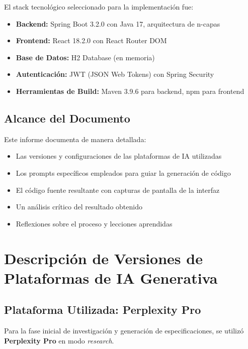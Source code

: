 \documentclass[11pt,a4paper]{article}
\begin{document}
El stack tecnológico seleccionado para la implementación fue:

\begin{itemize}
    \item \textbf{Backend:} Spring Boot 3.2.0 con Java 17, arquitectura de n-capas
    \item \textbf{Frontend:} React 18.2.0 con React Router DOM
    \item \textbf{Base de Datos:} H2 Database (en memoria)
    \item \textbf{Autenticación:} JWT (JSON Web Tokens) con Spring Security
    \item \textbf{Herramientas de Build:} Maven 3.9.6 para backend, npm para frontend
\end{itemize}

\subsection{Alcance del Documento}

Este informe documenta de manera detallada:

\begin{itemize}
    \item Las versiones y configuraciones de las plataformas de IA utilizadas
    \item Los prompts específicos empleados para guiar la generación de código
    \item El código fuente resultante con capturas de pantalla de la interfaz
    \item Un análisis crítico del resultado obtenido
    \item Reflexiones sobre el proceso y lecciones aprendidas
\end{itemize}

\newpage

\section{Descripción de Versiones de Plataformas de IA Generativa}

\subsection{Plataforma Utilizada: Perplexity Pro}

Para la fase inicial de investigación y generación de especificaciones, se utilizó \textbf{Perplexity Pro} en modo \textit{research}.
\end{document}
